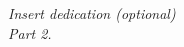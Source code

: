 \cleardoublepage
\thispagestyle{empty}
\begin{flushright}
\itshape Insert dedication (optional)\\ \vspace{5mm}
Part 2.
\end{flushright}
\cleardoublepage